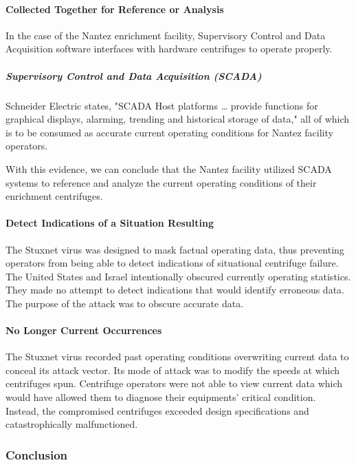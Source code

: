 \documentclass[12pt]{article}
\begin{document}
\begin{multicols}{2}
\paragraph{Collected Together for Reference or Analysis}

In the case of the Nantez enrichment facility, Supervisory Control and Data Acquisition software interfaces with hardware centrifuges to operate properly.

\subparagraph{Supervisory Control and Data Acquisition (SCADA)}

Schneider Electric states, "SCADA Host platforms … provide functions for graphical displays, alarming, trending and historical storage of data," all of which is to be consumed as accurate current operating conditions for Nantez facility operators.\cite{schneiderElectric}

With this evidence, we can conclude that the Nantez facility utilized SCADA systems to reference and analyze the current operating conditions of their enrichment centrifuges.


\paragraph{Detect Indications of a Situation Resulting}

The Stuxnet virus was designed to mask factual operating data, thus preventing operators from being able to detect indications of situational centrifuge failure. The United States and Israel intentionally obscured currently operating statistics. They made no attempt to detect indications that would identify erroneous data. The purpose of the attack was to obscure accurate data.

\paragraph{No Longer Current Occurrences}

The Stuxnet virus recorded past operating conditions overwriting current data to conceal its attack vector.  Its mode of attack was to modify the speeds at which centrifuges spun. Centrifuge operators were not able to view current data which would have allowed them to diagnose their equipments' critical condition. Instead, the compromised centrifuges exceeded design specifications and catastrophically malfunctioned.

\subsubsection{Conclusion}


\end{multicols}
\end{document}
